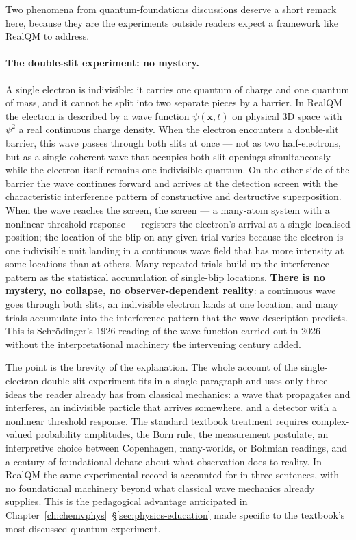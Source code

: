 Two phenomena from quantum-foundations discussions deserve a short remark here, because they are the experiments outside readers expect a framework like RealQM to address.

\paragraph{The double-slit experiment: no mystery.}
A single electron is indivisible: it carries one quantum of charge and one quantum of mass, and it cannot be split into two separate pieces by a barrier. In RealQM the electron is described by a wave function $\psi(\mathbf{x},t)$ on physical 3D space with $\psi^2$ a real continuous charge density. When the electron encounters a double-slit barrier, this wave passes through both slits at once --- not as two half-electrons, but as a single coherent wave that occupies both slit openings simultaneously while the electron itself remains one indivisible quantum. On the other side of the barrier the wave continues forward and arrives at the detection screen with the characteristic interference pattern of constructive and destructive superposition. When the wave reaches the screen, the screen --- a many-atom system with a nonlinear threshold response --- registers the electron's arrival at a single localised position; the location of the blip on any given trial varies because the electron is one indivisible unit landing in a continuous wave field that has more intensity at some locations than at others. Many repeated trials build up the interference pattern as the statistical accumulation of single-blip locations. \textbf{There is no mystery, no collapse, no observer-dependent reality}: a continuous wave goes through both slits, an indivisible electron lands at one location, and many trials accumulate into the interference pattern that the wave description predicts. This is Schr\"odinger's 1926 reading of the wave function carried out in 2026 without the interpretational machinery the intervening century added.

The point is the brevity of the explanation. The whole account of the single-electron double-slit experiment fits in a single paragraph and uses only three ideas the reader already has from classical mechanics: a wave that propagates and interferes, an indivisible particle that arrives somewhere, and a detector with a nonlinear threshold response. The standard textbook treatment requires complex-valued probability amplitudes, the Born rule, the measurement postulate, an interpretive choice between Copenhagen, many-worlds, or Bohmian readings, and a century of foundational debate about what observation does to reality. In RealQM the same experimental record is accounted for in three sentences, with no foundational machinery beyond what classical wave mechanics already supplies. This is the pedagogical advantage anticipated in Chapter~\ref{ch:chemvphys}~\S\ref{sec:physics-education} made specific to the textbook's most-discussed quantum experiment.

